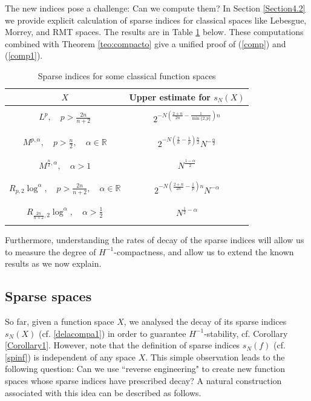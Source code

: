 \documentclass[11pt, a4paper,leqno]{amsart}
\theoremstyle{plain}
\numberwithin{equation}{section}
\theoremstyle{definition}
\theoremstyle{remark}
\def\R{\mathbb{R}}
\begin{document}
The  new indices pose a challenge: Can we compute them? In  Section \ref{Section4.2} we provide explicit calculation of sparse indices for classical spaces like Lebesgue, Morrey, and RMT spaces. The results are in Table \ref{Tabla1} below. These computations combined with Theorem \ref{teo:compacto} give a unified
proof of (\ref{comp}) and (\ref{comp1}).


\begin{table}[h]
\centering
\begin{tabular}
[c]{|c|c|}\hline
$X$ & Upper estimate for $s_N(X)$\\\hline
& \\
$L^p, \quad p > \frac{2 n}{n+2}$ & $2^{-N (\frac{2+n}{2n}-\frac{1}{\min\{2,p\}}) n}$\\
& \\\hline
& \\
$M^{p, \alpha}, \quad p > \frac{n}{2}, \quad \alpha \in \R$ &
$2^{-N(\frac{2}{n} -\frac{1}{p}) \frac{n}{2}} N^{-\frac{\alpha}{2}}$\\
& \\\hline
& \\
$M^{\frac{n}{2}, \alpha}, \quad \alpha > 1$ & $N^{\frac{1-\alpha}{2}}$\\
& \\\hline
& \\
$R_{p, 2} \log^\alpha, \quad p > \frac{2 n}{n+2}, \quad \alpha \in \R$ & $2^{-N (\frac{2+n}{2n}-\frac{1}{p}) n} N^{-\alpha}$ \\
& \\\hline
& \\
$R_{\frac{2 n}{n+2}, 2} \log^\alpha, \quad \alpha > \frac{1}{2}$ & $N^{ \frac{1}{2} -\alpha}$ \\
&  \\\hline
\end{tabular}
\caption{Sparse indices for some classical function spaces}%
\label{Tabla1}%
\end{table}


 Furthermore,
understanding the rates of decay of the sparse indices will allow us to measure the degree of $H^{-1}$-compactness, and allow us to
extend the known results as we now explain.



\subsection{Sparse spaces\label{sec:preambledecay}}

So far, given a function space $X$, we analysed the decay of its sparse indices $s_N(X)$ (cf. \eqref{delacompa1}) in order to guarantee $H^{-1}$-stability, cf. Corollary \ref{Corollary1}. However, note that the definition of sparse indices $s_N(f)$ (cf. \eqref{spinf}) is independent of any space $X$. This simple observation leads to the following question: Can we use ``reverse engineering" to create new function spaces whose sparse indices have prescribed decay? A natural construction associated with this idea can
be described as follows.
\end{document}
